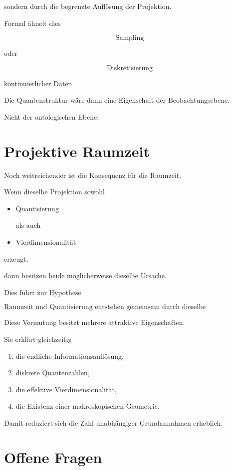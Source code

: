 sondern durch die begrenzte Auflösung der Projektion.

Formal ähnelt dies

\[
\text{Sampling}
\]

oder

\[
\text{Diskretisierung}
\]

kontinuierlicher Daten.

Die Quantenstruktur wäre dann eine Eigenschaft der Beobachtungsebene.

Nicht der ontologischen Ebene.

\section*{Projektive Raumzeit}

Noch weitreichender ist die Konsequenz für die Raumzeit.

Wenn dieselbe Projektion sowohl

\begin{itemize}
\item Quantisierung

als auch

\item Vierdimensionalität
\end{itemize}

erzeugt,

dann besitzen beide möglicherweise dieselbe Ursache.

Dies führt zur Hypothese

\[
\boxed{
\text{Raumzeit und Quantisierung entstehen gemeinsam
durch dieselbe Projektionsabbildung.}
}
\]

Diese Vermutung besitzt mehrere attraktive Eigenschaften.

Sie erklärt gleichzeitig

\begin{enumerate}
\item die endliche Informationsauflösung,
\item diskrete Quantenzahlen,
\item die effektive Vierdimensionalität,
\item die Existenz einer makroskopischen Geometrie.
\end{enumerate}

Damit reduziert sich die Zahl unabhängiger Grundannahmen erheblich.

\section*{Offene Fragen}

